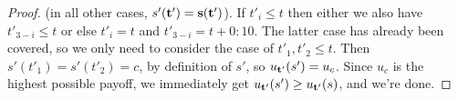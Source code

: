 \begin{proof}
(in all other cases, $s'(\bf t') = s(\bf t')$). 
If $t'_i \leq t$ then either we also have $t'_{3-i} \leq t$ or else $t'_i = t$ and $t'_{3-i} = t+ 0{:}10$. The latter case has already been covered, so we only need to consider the case of $t'_1,t'_2 \leq t$. Then $s'(t'_1) = s'(t'_2) = c$, by definition of $s'$, so $u_{\bf t'}(s') = u_c$. Since $u_c$ is the highest possible payoff, we immediately get $u_{\bf t'}(s') \geq u_{\bf t'} (s)$, and we're done.
\end{proof}


